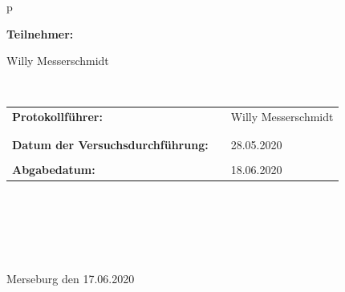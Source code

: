 \begin{center}
\begin{tabular}{p{\textwidth}}
\begin{center}
\Large{\textbf{Teilnehmer:}} \\ 
\end{center}
\begin{center}
\large{
	Willy Messerschmidt}
	
\end{center}


\\

\begin{center}
\begin{tabular}{lll}
\large{\textbf{Protokollführer:}} & & \large{Willy Messerschmidt} \\
&& \\
&&\\
\large{\textbf{Datum der Versuchsdurchführung:}}&& \large{28.05.2020}\\
&&\\
\large{\textbf{Abgabedatum:}}&& \large{18.06.2020}
\end{tabular}
\end{center}

\\ \\ \\ \\ \\ 
\large{Merseburg den 17.06.2020}

\end{tabular}
\end{center}
